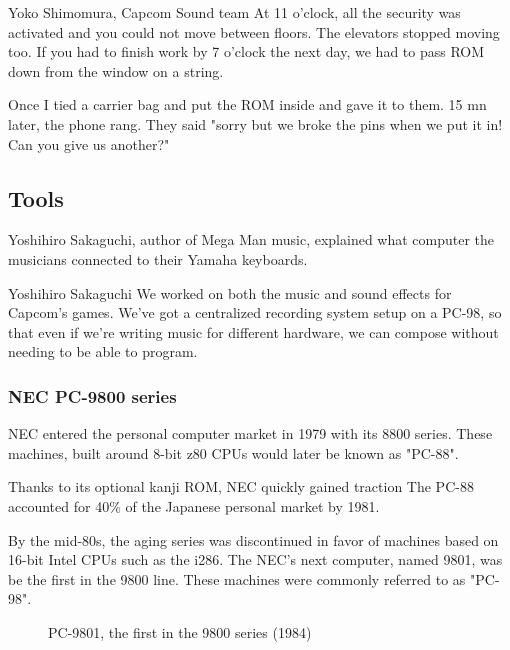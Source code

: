 \begin{q}{Yoko Shimomura, Capcom Sound team\cite{sf2musicsecurity}}
At 11 o'clock, all the security was activated and you could not move between floors. The elevators stopped moving too. If you had to finish work by 7 o'clock the next day, we had to pass ROM down from the window on a string.

Once I tied a carrier bag and put the ROM inside and gave it to them. 15 mn later, the phone rang. They said "sorry but we broke the pins when we put it in! Can you give us another?"
\end{q}



\subsection{Tools}
Yoshihiro Sakaguchi, author of Mega Man music, explained what computer the musicians connected to their Yamaha keyboards.

\begin{q}{Yoshihiro Sakaguchi\cite{yoko_shimomura_interview}  }
We worked on both the music and sound effects for Capcom’s games. We’ve got a centralized recording system setup on a PC-98, so that even if we’re writing music for different hardware, we can compose without needing to be able to program.
\end{q}

\subsubsection{NEC PC-9800 series}

NEC entered the personal computer market in 1979 with its 8800 series. These machines, built around 8-bit z80 CPUs would later be known as "PC-88". 

Thanks to its optional kanji ROM, NEC quickly gained traction The PC-88 accounted for 40\% of the Japanese personal market by 1981.

By the mid-80s, the aging series was discontinued in favor of machines based on 16-bit Intel CPUs such as the i286. The NEC's next computer, named 9801, was be the first in the 9800 line. These machines were commonly referred to as "PC-98".

\begin{figure}[H]

\caption*{PC-9801, the first in the 9800 series (1984)}
\end{figure}

